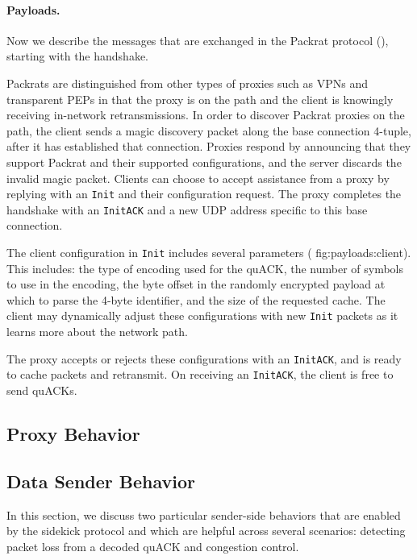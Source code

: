 

\paragraph{Payloads.} Now we describe the messages that are exchanged in the
Packrat protocol (), starting with the handshake.

Packrats are distinguished from other types of proxies such as VPNs and
transparent PEPs in that the proxy is on the path and the client is knowingly
receiving in-network retransmissions. In order to discover Packrat proxies on the
path, the client sends a magic discovery packet along the base connection
4-tuple, after it has established that connection. Proxies respond by
announcing that they support Packrat and their supported configurations, and the
server discards the invalid magic packet. Clients can choose to accept
assistance from a proxy by replying with an \texttt{Init} and their
configuration request. The proxy completes the handshake with an \texttt
{InitACK} and a new UDP address specific to this base connection.

The client configuration in \texttt{Init} includes several parameters (\Cref
{fig:payloads:client}). This includes: the type of encoding used for the quACK,
the number of symbols to use in the encoding, the byte offset in the randomly
encrypted payload at which to parse the 4-byte identifier, and the size of the
requested cache. The client may dynamically adjust these configurations with
new \texttt{Init} packets as it learns more about the network path.

The proxy accepts or rejects these configurations with an \texttt{InitACK}, and
is ready to cache packets and retransmit. On receiving an \texttt{InitACK}, the
client is free to send quACKs.

\subsection{Proxy Behavior}

\subsection{Data Sender Behavior}

In this section, we discuss two particular sender-side behaviors that are enabled by
the sidekick protocol and which are helpful across several scenarios: detecting packet loss
from a decoded quACK and congestion control.

